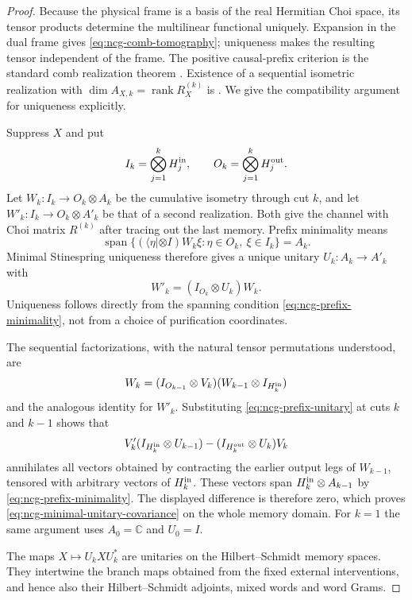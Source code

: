 \documentclass[11pt]{article}
\theoremstyle{definition}
\theoremstyle{remark}
\theoremstyle{definition}
\theoremstyle{remark}
\newcommand{\rank}{\operatorname{rank}}
\newcommand{\Span}{\operatorname{span}}
\begin{document}
\begin{proof}
Because the physical frame is a basis of the real Hermitian Choi space, its tensor
products determine the multilinear functional uniquely.  Expansion in the dual
frame gives \eqref{eq:ncg-comb-tomography}; uniqueness makes the resulting tensor
independent of the frame.  The positive causal-prefix criterion is the standard
comb realization theorem \cite{ChiribellaDArianoPerinotti2009}.  Existence of a
sequential isometric realization with
$\dim A_{X,k}=\rank R_X^{(k)}$ is
\cite[Theorem~2]{BisioDArianoPerinottiChiribella2011}.
We give the compatibility argument for uniqueness explicitly.

Suppress $X$ and put
\[
 I_k=\bigotimes_{j=1}^k H_j^{\rm in},\qquad
 O_k=\bigotimes_{j=1}^k H_j^{\rm out}.
\]
Let $W_k:I_k\to O_k\otimes A_k$ be the cumulative isometry through cut $k$,
and let $W'_k:I_k\to O_k\otimes A'_k$ be that of a second realization.
Both give the channel with Choi matrix $R^{(k)}$ after tracing out the last
memory.  Prefix minimality means
\begin{equation}
 \Span\{(\langle\eta|\otimes I)W_k\xi:
           \eta\in O_k,\ \xi\in I_k\}=A_k.
 \label{eq:ncg-prefix-minimality}
\end{equation}
Minimal Stinespring uniqueness \cite{Stinespring1955} therefore gives a unique
unitary $U_k:A_k\to A'_k$ with
\begin{equation}
 W'_k=(I_{O_k}\otimes U_k)W_k.
 \label{eq:ncg-prefix-unitary}
\end{equation}
Uniqueness follows directly from the spanning condition
\eqref{eq:ncg-prefix-minimality}, not from a choice of purification coordinates.

The sequential factorizations, with the natural tensor permutations understood,
are
\[
 W_k=(I_{O_{k-1}}\otimes V_k)(W_{k-1}\otimes I_{H_k^{\rm in}})
\]
and the analogous identity for $W'_k$.  Substituting
\eqref{eq:ncg-prefix-unitary} at cuts $k$ and $k-1$ shows that
\[
 V'_k(I_{H_k^{\rm in}}\otimes U_{k-1})
 -(I_{H_k^{\rm out}}\otimes U_k)V_k
\]
annihilates all vectors obtained by contracting the earlier output legs of
$W_{k-1}$, tensored with arbitrary vectors of $H_k^{\rm in}$.
These vectors span $H_k^{\rm in}\otimes A_{k-1}$ by
\eqref{eq:ncg-prefix-minimality}.  The displayed difference is therefore zero,
which proves \eqref{eq:ncg-minimal-unitary-covariance} on the whole memory domain.
For $k=1$ the same argument uses $A_0=\mathbb C$ and $U_0=I$.

The maps $X\mapsto U_kXU_k^*$ are unitaries on the Hilbert--Schmidt memory
spaces.  They intertwine the branch maps obtained from the fixed external
interventions, and hence also their Hilbert--Schmidt adjoints, mixed words and
word Grams.
\end{proof}
\end{document}
